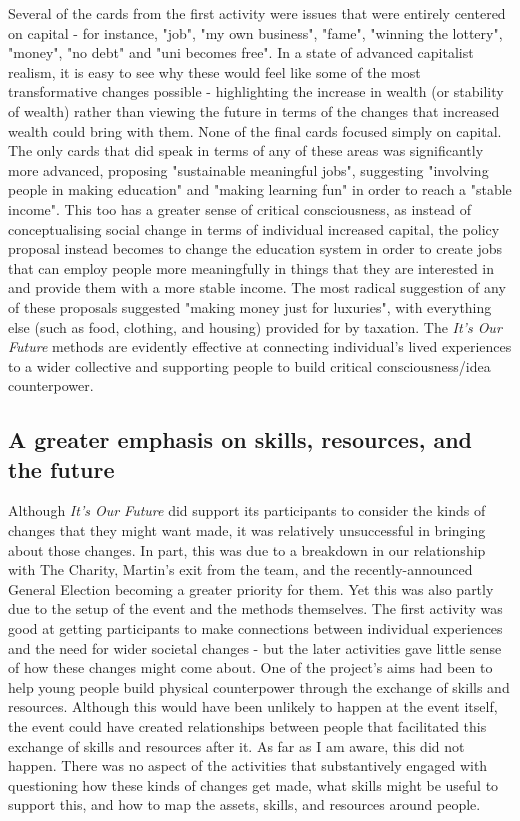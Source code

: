 Several of the cards from the first activity were issues that were entirely centered on capital - for instance, "job", "my own business", "fame", "winning the lottery", "money", "no debt" and "uni becomes free". In a state of advanced capitalist realism, it is easy to see why these would feel like some of the most transformative changes possible - highlighting the increase in wealth (or stability of wealth) rather than viewing the future in terms of the changes that increased wealth could bring with them. None of the final cards focused simply on capital. The only cards that did speak in terms of any of these areas was significantly more advanced, proposing "sustainable meaningful jobs", suggesting "involving people in making education" and "making learning fun" in order to reach a "stable income". This too has a greater sense of critical consciousness, as instead of conceptualising social change in terms of individual increased capital, the policy proposal instead becomes to change the education system in order to create jobs that can employ people more meaningfully in things that they are interested in and provide them with a more stable income. The most radical suggestion of any of these proposals suggested "making money just for luxuries", with everything else (such as food, clothing, and housing) provided for by taxation. The \textit{It's Our Future} methods are evidently effective at connecting individual's lived experiences to a wider collective and supporting people to build critical consciousness/idea counterpower. 

\subsection{A greater emphasis on skills, resources, and the future}
Although \textit{It's Our Future} did support its participants to consider the kinds of changes that they might want made, it was relatively unsuccessful in bringing about those changes. In part, this was due to a breakdown in our relationship with The Charity, Martin's exit from the team, and the recently-announced General Election becoming a greater priority for them. Yet this was also partly due to the setup of the event and the methods themselves. The first activity was good at getting participants to make connections between individual experiences and the need for wider societal changes - but the later activities gave little sense of how these changes might come about. One of the project's aims had been to help young people build physical counterpower through the exchange of skills and resources. Although this would have been unlikely to happen at the event itself, the event could have created relationships between people that facilitated this exchange of skills and resources after it. As far as I am aware, this did not happen. There was no aspect of the activities that substantively engaged with questioning how these kinds of changes get made, what skills might be useful to support this, and how to map the assets, skills, and resources around people. 


